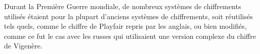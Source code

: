 
Durant la Première Guerre mondiale, de nombreux systèmes de
chiffrements utilisés étaient pour la plupart d'anciens systèmes de
chiffrements, soit réutilisés tels quels, comme le chiffre de Playfair
repris par les anglais, ou bien modifiés, comme ce fut le cas
avec les russes qui utilisaient une version complexe du chiffre de
Vigenère.\\

